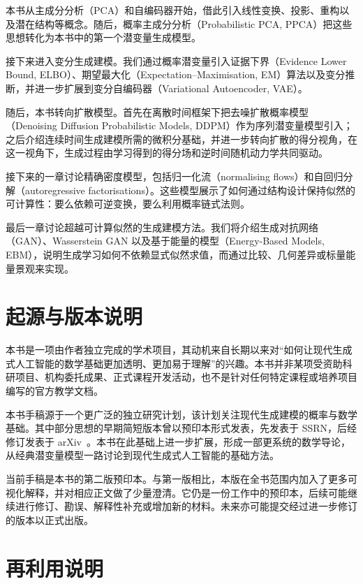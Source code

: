 本书从主成分分析（PCA）和自编码器开始，借此引入线性变换、投影、重构以及潜在结构等概念。随后，概率主成分分析（Probabilistic PCA, PPCA）把这些思想转化为本书中的第一个潜变量生成模型。

接下来进入变分生成建模。我们通过概率潜变量引入证据下界（Evidence Lower Bound, ELBO）、期望最大化（Expectation--Maximisation, EM）算法以及变分推断，并进一步扩展到变分自编码器（Variational Autoencoder, VAE）。

随后，本书转向扩散模型。首先在离散时间框架下把去噪扩散概率模型（Denoising Diffusion Probabilistic Models, DDPM）作为序列潜变量模型引入；之后介绍连续时间生成建模所需的微积分基础，并进一步转向扩散的得分视角，在这一视角下，生成过程由学习得到的得分场和逆时间随机动力学共同驱动。

接下来的一章讨论精确密度模型，包括归一化流（normalising flows）和自回归分解（autoregressive factorisations）。这些模型展示了如何通过结构设计保持似然的可计算性：要么依赖可逆变换，要么利用概率链式法则。

最后一章讨论超越可计算似然的生成建模方法。我们将介绍生成对抗网络（GAN）、Wasserstein GAN 以及基于能量的模型（Energy-Based Models, EBM），说明生成学习如何不依赖显式似然求值，而通过比较、几何差异或标量能量景观来实现。


\section*{起源与版本说明}
%

本书是一项由作者独立完成的学术项目，其动机来自长期以来对“如何让现代生成式人工智能的数学基础更加透明、更加易于理解”的兴趣。本书并非某项受资助科研项目、机构委托成果、正式课程开发活动，也不是针对任何特定课程或培养项目编写的官方教学文档。

本书手稿源于一个更广泛的独立研究计划，该计划关注现代生成建模的概率与数学基础。其中部分思想的早期简短版本曾以预印本形式发表，先发表于 SSRN，后经修订发表于 arXiv~\cite{chen2025plvm,chen2025unified}。本书在此基础上进一步扩展，形成一部更系统的数学导论，从经典潜变量模型一路讨论到现代生成式人工智能的基础方法。

当前手稿是本书的第二版预印本。与第一版相比，本版在全书范围内加入了更多可视化解释，并对相应正文做了少量澄清。它仍是一份工作中的预印本，后续可能继续进行修订、勘误、解释性补充或增加新的材料。未来亦可能提交经过进一步修订的版本以正式出版。

\section*{再利用说明}
%

